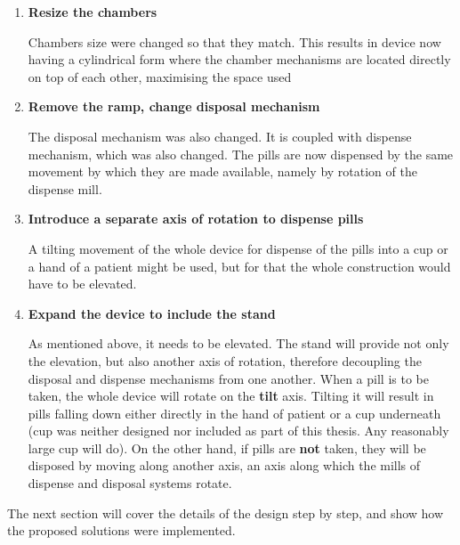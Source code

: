 \begin{enumerate}
	\item{\textbf{Resize the chambers}} 
	
	Chambers size were changed so that they match. This results in device now having a cylindrical form where the chamber mechanisms are located directly on top of each other, maximising the space used
	\item{\textbf{Remove the ramp, change disposal mechanism}} 
	
	The disposal mechanism was also changed. It is coupled with dispense mechanism, which was also changed. The pills are now dispensed by the same movement by which they are made available, namely by rotation of the dispense mill. 
	\item{\textbf{Introduce a separate axis of rotation to dispense pills}} 
	
	A tilting movement of the whole device for dispense of the pills into a cup or a hand of a patient might be used, but for that the whole construction would have to be elevated.
	\item{\textbf{Expand the device to include the stand}} 
	
	As mentioned above, it needs to be elevated. The stand will provide not only the elevation, but also another axis of rotation, therefore decoupling the disposal and dispense mechanisms from one another. When a pill is to be taken, the whole device will rotate on the \textbf{tilt} axis. Tilting it will result in pills falling down either directly in the hand of patient or a cup underneath (cup was neither designed nor included as part of this thesis. Any reasonably large cup will do). On the other hand, if pills are \textbf{not} taken, they will be disposed by moving along another axis, an axis along which the mills of dispense and disposal systems rotate.
\end{enumerate}
 The next section will cover the details of the design step by step, and show how the proposed solutions were implemented.

